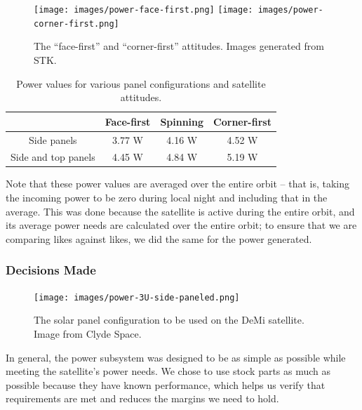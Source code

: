 \documentclass[12pt]{article}
\begin{document}
			\begin{figure}[ht]%
			\centering
			\texttt{[image: images/power-face-first.png]}%
			\hspace{0.5in}
			\texttt{[image: images/power-corner-first.png]}
			\caption{The ``face-first'' and ``corner-first'' attitudes.  Images generated from STK.}%
			\label{fig:power-face-first}%
			\end{figure}
			
			\begin{table}[ht]\label{table:power-trade-study}
\caption{Power values for various panel configurations and satellite attitudes.}
\begin{center}
    \begin{tabular}{|c|c|c|c|} \hline
    	 & Face-first & Spinning & Corner-first \\ \hline
Side panels & 3.77 W & 4.16 W & 4.52 W \\\hline
Side and top panels & 4.45 W & 4.84 W & 5.19 W \\\hline
    \end{tabular}
\end{center}
\end{table}

Note that these power values are averaged over the entire orbit -- that is, taking the incoming power to be zero during local night and including that in the average.  This was done because the satellite is active during the entire orbit, and its average power needs are calculated over the entire orbit; to ensure that we are comparing likes against likes, we did the same for the power generated.
			
			\subsubsection{Decisions Made}
			
			\begin{figure}%
			\centering
			\texttt{[image: images/power-3U-side-paneled.png]}%
			\caption{The solar panel configuration to be used on the DeMi satellite.  Image from Clyde Space.\cite{CS-image}}%
			\label{fig:power-panels}%
			\end{figure}
			
In general, the power subsystem was designed to be as simple as possible while meeting the satellite's power needs.  We chose to use stock parts as much as possible because they have known performance, which helps us verify that requirements are met and reduces the margins we need to hold.
\end{document}
